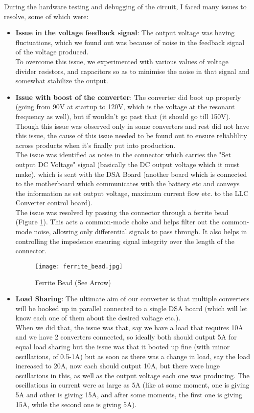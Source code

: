 During the hardware testing and debugging of the circuit, I faced many issues to resolve, some of which were:
\begin{itemize}
    \item \textbf{Issue in the voltage feedback signal}: The output voltage was having fluctuations, which we found out was because of noise in the feedback signal of the voltage produced.\\
    To overcome this issue, we experimented with various values of voltage divider resistors, and capacitors so as to minimise the noise in that signal and somewhat stabilize the output.
    \item \textbf{Issue with boost of the converter}: The converter did boot up properly (going from 90V at startup to 120V, which is the voltage at the resonant frequency as well), but if wouldn't go past that (it should go till 150V). Though this issue was observed only in some converters and rest did not have this issue, the cause of this issue needed to be found out to ensure reliablility across products when it's finally put into production.\\
    The issue was identified as noise in the connector which carries the "Set output DC Voltage" signal (basically the DC output voltage which it must make), which is sent with the DSA Board (another board which is connected to the motherboard which communicates with the battery etc and conveys the information as set output voltage, maximum current flow etc. to the LLC Converter control board).\\
    The issue was resolved by passing the connector through a ferrite bead (Figure \ref*{fig:ferrite-bead}). This acts a common-mode choke and helps filter out the common-mode noise, allowing only differential signals to pass through. It also helps in controlling the impedence ensuring signal integrity over the length of the connector.
    \begin{figure}[H]
        \centering
        \texttt{[image: ferrite\_bead.jpg]}
        \caption{Ferrite Bead (See Arrow)}
        \label{fig:ferrite-bead}
    \end{figure}
    \item \textbf{Load Sharing}: The ultimate aim of our converter is that multiple converters will be hooked up in parallel connected to a single DSA board (which will let know each one of them about the desired voltage etc.).\\
    When we did that, the issue was that, say we have a load that requires 10A and we have 2 converters connected, so ideally both should output 5A for equal load sharing but the issue was that it booted up fine (with minor oscillations, of 0.5-1A) but as soon as there was a change in load, say the load increased to 20A, now each should output 10A, but there were huge oscillations in this, as well as the output voltage each one was producing. The oscillations in current were as large as 5A (like at some moment, one is giving 5A and other is giving 15A, and after some moments, the first one is giving 15A, while the second one is giving 5A).\\

\end{itemize}
